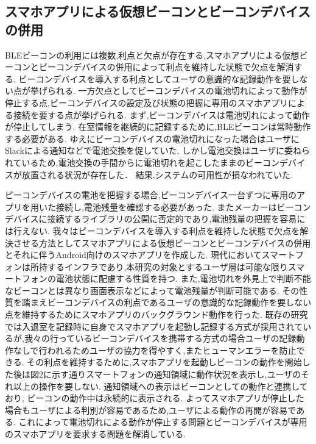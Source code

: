 
\subsection{スマホアプリによる仮想ビーコンとビーコンデバイスの併用}



 BLEビーコンの利用には複数,利点と欠点が存在する,スマホアプリによる仮想ビーコンとビーコンデバイスの併用によって利点を維持した状態で欠点を解消する.
 ビーコンデバイスを導入する利点としてユーザの意識的な記録動作を要しない点が挙げられる.
一方欠点としてビーコンデバイスの電池切れによって動作が停止する点,ビーコンデバイスの設定及び状態の把握に専用のスマホアプリによる接続を要する点が挙げられる.
まず,ビーコンデバイスは電池切れによって動作が停止してしまう.
在室情報を継続的に記録するために,BLEビーコンは常時動作する必要がある.
ゆえにビーコンデバイスの電池切れになった場合はユーザにSlackによる通知などで電池交換を促していた.
しかし電池交換はユーザに委ねられているため,電池交換の手間からに電池切れを起こしたままのビーコンデバイスが放置される状況が存在した．
結果,システムの可用性が損なわれていた.

 ビーコンデバイスの電池を把握する場合,ビーコンデバイス一台ずつに専用のアプリを用いた接続し,電池残量を確認する必要があった.
またメーカーはビーコンデバイスに接続するライブラリの公開に否定的であり,電池残量の把握を容易には行えない.
我々はビーコンデバイスを導入する利点を維持した状態で欠点を解決させる方法としてスマホアプリによる仮想ビーコンとビーコンデバイスの併用とそれに伴うAndroid向けのスマホアプリを作成した.
 現代においてスマートフォンは所持するインフラであり,本研究の対象とするユーザ層は可能な限りスマートフォンの電池状態に配慮する性質を持つ.
また,電池切れを外見上で判断不能なビーコンとは異なり画面表示などによって電池残量が判断可能である.
その性質を踏まえビーコンデバイスの利点であるユーザの意識的な記録動作を要しない点を維持するためにスマホアプリのバックグラウンド動作を行った.
 既存の研究では入退室を記録時に自身でスマホアプリを起動し記録する方式が採用されているが,我々の行っているビーコンデバイスを携帯する方式の場合ユーザの記録動作なしで行われるためユーザの協力を得やすく,またヒューマンエラーを防止できる.
その利点を維持するために,スマホアプリを起動しビーコンの動作を開始した後は図2に示す通りスマートフォンの通知領域に動作状況を表示し,ユーザのそれ以上の操作を要しない.
通知領域への表示はビーコンとしての動作と連携しており, ビーコンの動作中は永続的に表示される.
よってスマホアプリが停止した場合もユーザによる判別が容易であるため,ユーザによる動作の再開が容易である.
これによって電池切れによる動作が停止する問題とビーコンデバイスが専用のスマホアプリを要求する問題を解消している.

